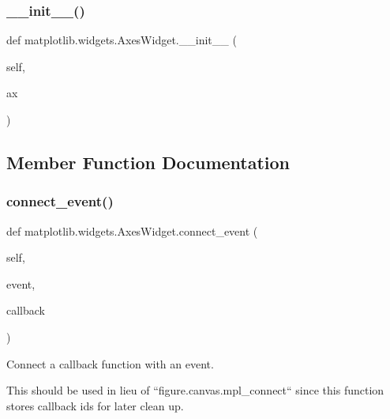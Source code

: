 \subsubsection{\texorpdfstring{\+\_\+\+\_\+init\+\_\+\+\_\+()}{\_\_init\_\_()}}
{\footnotesize\ttfamily def matplotlib.\+widgets.\+Axes\+Widget.\+\_\+\+\_\+init\+\_\+\+\_\+ (\begin{DoxyParamCaption}\item[{}]{self,  }\item[{}]{ax }\end{DoxyParamCaption})}



\subsection{Member Function Documentation}
\mbox{\label{classmatplotlib_1_1widgets_1_1AxesWidget_a143390178661205845d5b37ec167463a}} 
\subsubsection{\texorpdfstring{connect\+\_\+event()}{connect\_event()}}
{\footnotesize\ttfamily def matplotlib.\+widgets.\+Axes\+Widget.\+connect\+\_\+event (\begin{DoxyParamCaption}\item[{}]{self,  }\item[{}]{event,  }\item[{}]{callback }\end{DoxyParamCaption})}

\begin{DoxyVerb}Connect a callback function with an event.

This should be used in lieu of ``figure.canvas.mpl_connect`` since this
function stores callback ids for later clean up.
\end{DoxyVerb}
 \mbox{\label{classmatplotlib_1_1widgets_1_1AxesWidget_a8b5b89b292049847edc362431bd538b4}} 
